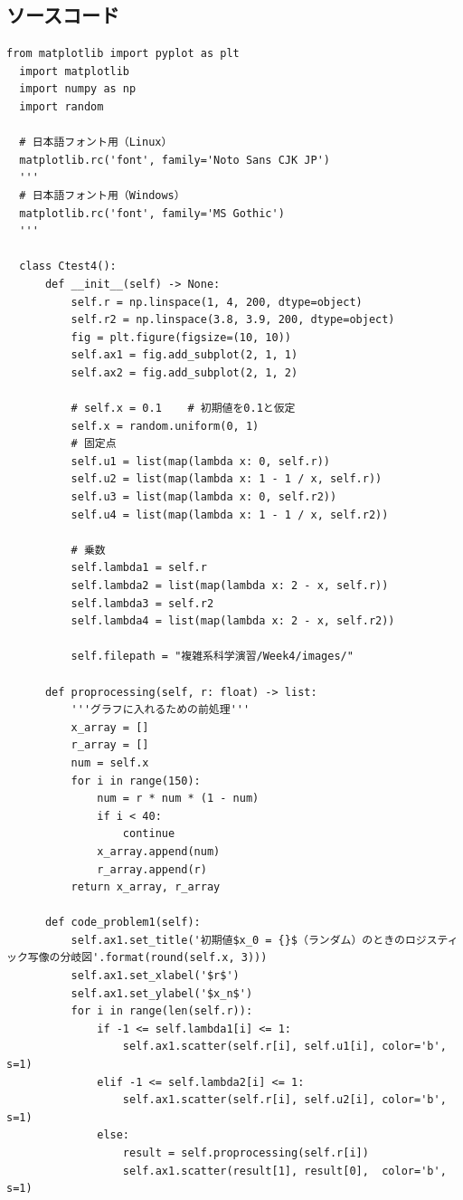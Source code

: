 \subsection{ソースコード}
\begin{lstlisting}[caption=week3.py]
  from matplotlib import pyplot as plt
  import matplotlib
  import numpy as np
  import random

  # 日本語フォント用（Linux）
  matplotlib.rc('font', family='Noto Sans CJK JP')
  '''
  # 日本語フォント用（Windows）
  matplotlib.rc('font', family='MS Gothic')
  '''

  class Ctest4():
      def __init__(self) -> None:
          self.r = np.linspace(1, 4, 200, dtype=object)
          self.r2 = np.linspace(3.8, 3.9, 200, dtype=object)
          fig = plt.figure(figsize=(10, 10))
          self.ax1 = fig.add_subplot(2, 1, 1)
          self.ax2 = fig.add_subplot(2, 1, 2)

          # self.x = 0.1    # 初期値を0.1と仮定
          self.x = random.uniform(0, 1)
          # 固定点
          self.u1 = list(map(lambda x: 0, self.r))
          self.u2 = list(map(lambda x: 1 - 1 / x, self.r))
          self.u3 = list(map(lambda x: 0, self.r2))
          self.u4 = list(map(lambda x: 1 - 1 / x, self.r2))

          # 乗数
          self.lambda1 = self.r
          self.lambda2 = list(map(lambda x: 2 - x, self.r))
          self.lambda3 = self.r2
          self.lambda4 = list(map(lambda x: 2 - x, self.r2))
          
          self.filepath = "複雑系科学演習/Week4/images/"

      def proprocessing(self, r: float) -> list:
          '''グラフに入れるための前処理'''
          x_array = []
          r_array = []
          num = self.x
          for i in range(150):
              num = r * num * (1 - num)
              if i < 40:
                  continue
              x_array.append(num)
              r_array.append(r)
          return x_array, r_array

      def code_problem1(self):
          self.ax1.set_title('初期値$x_0 = {}$（ランダム）のときのロジスティック写像の分岐図'.format(round(self.x, 3)))
          self.ax1.set_xlabel('$r$')
          self.ax1.set_ylabel('$x_n$')
          for i in range(len(self.r)):
              if -1 <= self.lambda1[i] <= 1:
                  self.ax1.scatter(self.r[i], self.u1[i], color='b', s=1)
              elif -1 <= self.lambda2[i] <= 1:
                  self.ax1.scatter(self.r[i], self.u2[i], color='b', s=1)
              else:
                  result = self.proprocessing(self.r[i])
                  self.ax1.scatter(result[1], result[0],  color='b', s=1)


\end{lstlisting}
